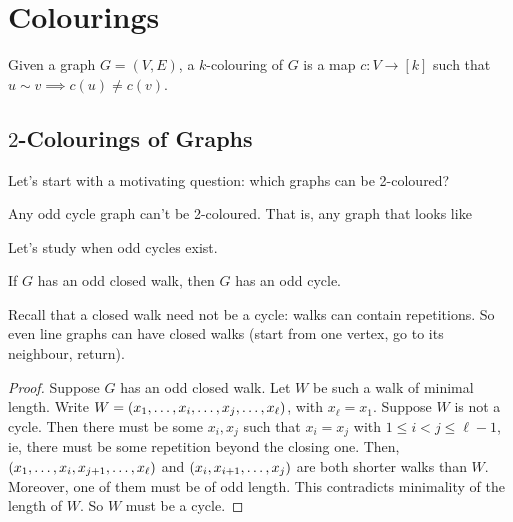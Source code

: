 \section{Colourings}

\begin{boxdefinition}[Colouring]
    Given a graph $G = (V, E)$, a $k$-colouring of $G$ is a map $c : V \to [k]$ such that $u \sim v \implies c(u) \ne c(v)$.
\end{boxdefinition}

\subsection{$2$-Colourings of Graphs}

Let's start with a motivating question: which graphs can be 2-coloured?

Any odd cycle graph can't be 2-coloured. That is, any graph that looks like
\begin{figure}[H]
    \centering
\end{figure}

Let's study when odd cycles exist.

\begin{boxlemma}\label{Ch2:Lemma:Odd_Closed_Walk}
    If $G$ has an odd closed walk, then $G$ has an odd cycle.
\end{boxlemma}
Recall that a closed walk need not be a cycle: walks can contain repetitions. So even line graphs can have closed walks (start from one vertex, go to its neighbour, return).
\begin{proof}
    Suppose $G$ has an odd closed walk. Let $W$ be such a walk of minimal length. Write $W = \left( x_1, \ldots, x_i, \ldots, x_j, \ldots, x_{\ell} \right)$, with $x_{\ell} = x_1$. Suppose $W$ is not a cycle. Then there must be some $x_i, x_j$ such that $x_i = x_j$ with $1 \leq i < j \leq \ell - 1$, ie, there must be some repetition beyond the closing one. Then, $\left( x_1, \ldots, x_i, x_{j+1}, \ldots, x_{\ell} \right)$ and $\left( x_i, x_{i+1}, \ldots, x_{j} \right)$ are both shorter walks than $W$. Moreover, one of them must be of odd length. This contradicts minimality of the length of $W$. So $W$ must be a cycle.
\end{proof}

